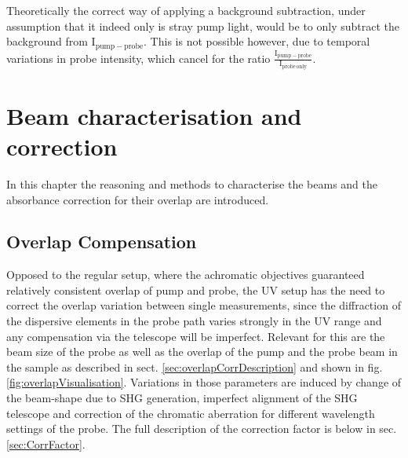 \documentclass[twoside,openright]{scrreprt}
\begin{document}
{Theoretically the correct way of applying a background subtraction, under assumption that it indeed only is stray pump light, would be to only subtract the background from $\mathrm{I_{pump-probe}}$. This is not possible however, due to temporal variations in probe intensity, which cancel for the ratio $\mathrm{\frac{I_{pump-probe}}{I_{probe\, only}}}$.



\chapter{Beam characterisation and correction}\label{chp:OverlapCorrection}
In this chapter the reasoning and methods to characterise the beams and the absorbance correction for their overlap are introduced.
\section{Overlap Compensation}
Opposed to the regular setup, where the achromatic objectives guaranteed relatively consistent overlap of pump and probe, the UV setup has the need to correct the overlap variation between single measurements, since the diffraction of the dispersive elements in the probe path varies strongly in the UV range and any compensation via the telescope will be imperfect.\newline
Relevant for this are the beam size of the probe as well as the overlap of the pump and the probe beam in the sample as described in sect. \ref{sec:overlapCorrDescription} and shown in fig. \ref{fig:overlapVisualisation}. Variations in those parameters are induced by change of the beam-shape due to SHG generation, imperfect alignment of the SHG telescope and correction of the chromatic aberration for different wavelength settings of the probe. The full description of the correction factor is below in sec. \ref{sec:CorrFactor}.\newline

}
\end{document}

